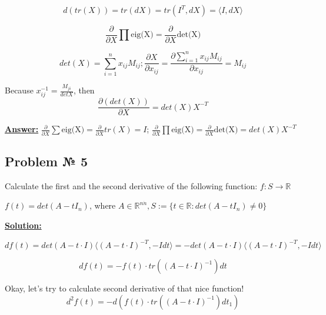 \begin{equation*}
    d(tr(X)) = tr(dX) = tr(I^T, dX) = \langle I, dX \rangle
\end{equation*}

\begin{equation*}
    \frac{\partial}{\partial X} \prod \text{eig(X)} = \frac{\partial}{\partial X} \text{det(X)}
\end{equation*}

\begin{equation*}
    det(X) = \sum\limits_{i=1}^n x_{ij}M_{ij}; \frac{\partial X}{\partial x_{ij}} = \frac{ \partial \sum\limits_{i=1}^n x_{ij}M_{ij}}{\partial x_{ij}} = M_{ij}
\end{equation*}

Because $x_{ij}^{-1} = \frac{M_{ji}}{detX}$, then
\begin{equation*}
    \frac{\partial (det(X))}{\partial X} = det(X)X^{-T}
\end{equation*}

\underline{\textbf{Answer:}}
 $\frac{\partial}{\partial X} \sum \text{eig(X)} = \frac{\partial}{\partial X} tr(X) = I$; 
 $\frac{\partial}{\partial X} \prod \text{eig(X)} = \frac{\partial}{\partial X} \text{det(X)} = det(X)X^{-T}$
 
 
\subsection{Problem № 5}
Calculate the first and the second derivative of the following function: $f : S \rightarrow \mathds{R}$

$f(t) = det(A-tI_n)$, where $A \in \mathds{R}^{n \dot n}, S := \{ t \in \mathds{R} : det(A-tI_n) \not = 0 \}$

\underline{\textbf{Solution:}}

\begin{equation*}
    df(t) = det(A-t\cdot I) \langle (A - t \cdot I)^{-T}, -Idt \rangle = -det(A-t\cdot I) \langle (A - t \cdot I)^{-T}, -Idt \rangle
\end{equation*}

\begin{equation*}
    df(t) = -f(t) \cdot tr \left( (A-t \cdot I)^{-1} \right) dt
\end{equation*}

Okay, let's try to calculate second derivative of that nice function!
\begin{equation*}
    d^2f(t) = -d\left(f(t) \cdot tr \left( (A-t \cdot I)^{-1} \right) dt_1 \right)
\end{equation*}

